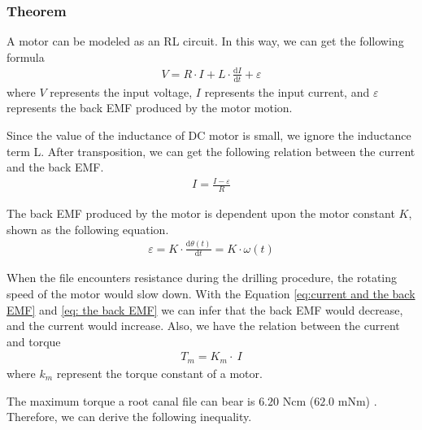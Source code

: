 \subsubsection{Theorem}
\hspace*{6mm}A motor can be modeled as an RL circuit. In this way, we can get the following formula 
\begin{equation}
\begin{split}
V = R \cdot I + L  \cdot \frac{\mathrm{d}I}{\mathrm{d}t} + \varepsilon
\end{split}
\end{equation}
where $V$ represents the input voltage, $I$ represents the input current, and $\varepsilon $ represents the back EMF produced by the motor motion.
\par
Since the value of the inductance of DC motor is small, we ignore the inductance term L. After transposition, we can get the following relation between the current and the back EMF.
\begin{equation}
\label{eq:current and the back EMF}
\begin{split}
I = \frac{I - \varepsilon}{R}
\end{split}
\end{equation}
\par\noindent
The back EMF produced by the motor is dependent upon the motor constant $K$, shown as the following equation.
\begin{equation}
\label{eq: the back EMF}
\begin{split}
\varepsilon  = K \cdot \frac{\mathrm{d}\theta (t)}{\mathrm{d}t} = K \cdot \omega (t)
\end{split}
\end{equation}
\par
When the file encounters resistance during the drilling procedure, the rotating speed of the motor would slow down. With the Equation \ref{eq:current and the back EMF} and \ref{eq: the back EMF} we can infer that the back EMF would decrease, and the current would increase.
Also, we have the relation between the current and torque
\begin{equation}
\begin{split}
T_m = K_m  \cdot \ I
\end{split}
\end{equation}
where $k_m$ represent the torque constant of a motor.
\par\noindent
The maximum torque a root canal file can bear is $6.20$ Ncm ($62.0$ mNm) \cite{boessler2009effect}. Therefore, we can derive the following inequality.
